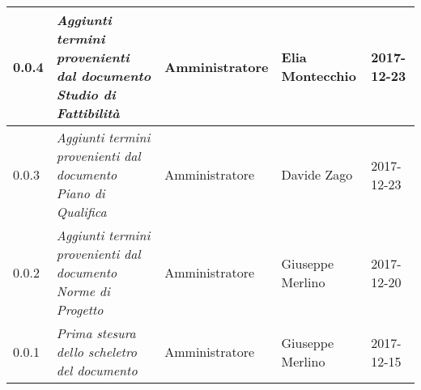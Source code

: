 \begin{table}[H]
\begin{tabular}{p{2cm}|C{4cm}|C{3cm}|R{3cm}|R{2cm}}
		0.0.4 & \emph{Aggiunti termini provenienti dal documento Studio di Fattibilità} & Amministratore & Elia Montecchio & 2017-12-23 \\
		\hline
		
		0.0.3 & \emph{Aggiunti termini provenienti dal documento Piano di Qualifica}  & Amministratore & Davide Zago & 2017-12-23 \\
		\hline
		
		0.0.2 & \emph{Aggiunti termini provenienti dal documento Norme di Progetto}  & Amministratore & Giuseppe Merlino & 2017-12-20 \\
		\hline
		
		0.0.1 & \emph{Prima stesura dello scheletro del documento} & Amministratore  & Giuseppe Merlino & 2017-12-15   \\
		
	\end{tabular}
	
\end{table}


\clearpage